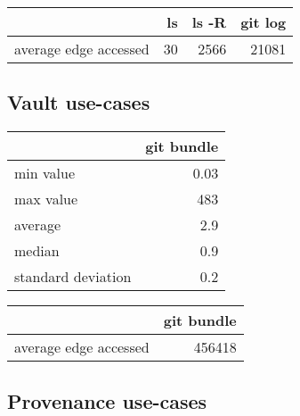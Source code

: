 \documentclass[11pt,a4paper]{article}
\begin{document}
\begin{center}
    \begin{tabular}{@{} l *3r @{}}
        \toprule
        \multicolumn{1}{c}{} &
            \textbf{ls} &
            \textbf{ls -R} &
            \textbf{git log} \\
        \midrule
        average edge accessed & 30 & 2566 & 21081 \\
        \bottomrule
    \end{tabular}
\end{center}

\newpage

\subsection{Vault use-cases}

\begin{center}
    \begin{tabular}{@{} l r @{}}
        \toprule
        \multicolumn{1}{c}{} &
            \textbf{git bundle} \\
        \midrule
        min value & 0.03 \\
        max value & 483 \\
        average & 2.9 \\
        median & 0.9 \\
        standard deviation & 0.2 \\
        \bottomrule
    \end{tabular}
\end{center}

\vspace{0.5cm}

\begin{center}
    \begin{tabular}{@{} l r @{}}
        \toprule
        \multicolumn{1}{c}{} &
            \textbf{git bundle} \\
        \midrule
        average edge accessed & 456418 \\
        \bottomrule
    \end{tabular}
\end{center}

\subsection{Provenance use-cases}
\end{document}
